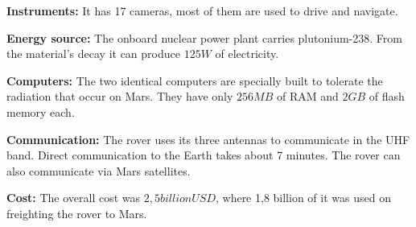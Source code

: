 \begin{tcolorbox}[colback=red!5,colframe=DarkRed!40!black,title=Mars \& Curiosity: The Red Planet and the rover]
\textbf{Instruments:} It has 17 cameras, most of them are used to drive and navigate.

\textbf{Energy source:} The onboard nuclear power plant carries plutonium-238.
From the material's decay it can produce $125 W$ of electricity.

\textbf{Computers:} The two identical computers are specially built to tolerate the radiation that occur on Mars.
They have only $256 MB$ of RAM and $2 GB$ of flash memory each.

\textbf{Communication:} The rover uses its three antennas to communicate in the UHF band.
Direct communication to the Earth takes about 7 minutes.
The rover can also communicate via Mars satellites.

\textbf{Cost:} The overall cost was $2,5 billion USD$, where 1,8 billion of it was used on freighting the rover to Mars.
\end{tcolorbox}